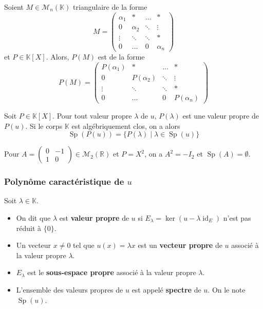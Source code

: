 	\begin{proposition}
		Soient $M \in \mathcal{M}_n(\mathbb{K})$ triangulaire de la forme
		\[
			M = \begin{pmatrix}
				\alpha_1 & * & \dots & * \\
				0 & \alpha_2 & \ddots & \vdots \\
				\vdots & \ddots & \ddots & * \\
				0 & \dots & 0 & \alpha_n
			\end{pmatrix}
		\]
		et $P \in \mathbb{K}[X]$. Alors, $P(M)$ est de la forme
		\[
		P(M) = \begin{pmatrix}
			P(\alpha_1) & * & \dots & * \\
			0 & P(\alpha_2) & \ddots & \vdots \\
			\vdots & \ddots & \ddots & * \\
			0 & \dots & 0 & P(\alpha_n)
		\end{pmatrix}
		\]
	\end{proposition}
	
	
	\begin{theorem}
		Soit $P \in \mathbb{K}[X]$. Pour tout valeur propre $\lambda$ de $u$, $P(\lambda)$ est une valeur propre de $P(u)$. Si le corps $\mathbb{K}$ est algébriquement clos, on a alors
		\[ \operatorname{Sp}(P(u)) = \{ P(\lambda) \mid \lambda \in \operatorname{Sp}(u) \} \]
	\end{theorem}
	
	\begin{cexample}
		Pour $A = \begin{pmatrix} 0 & -1 \\ 1 & 0 \end{pmatrix} \in \mathcal{M}_2(\mathbb{R})$ et $P = X^2$, on a $A^2 = -I_2$ et $\operatorname{Sp}(A) = \emptyset$.
	\end{cexample}
	
	\subsubsection{Polynôme caractéristique de \texorpdfstring{$u$}{u}}
	
	
	\begin{definition}
		Soit $\lambda \in \mathbb{K}$.
		\begin{itemize}
			\item On dit que $\lambda$ est \textbf{valeur propre} de $u$ si $E_\lambda = \ker(u - \lambda \operatorname{id}_E)$ n'est pas réduit à $\{ 0 \}$.
			\item Un vecteur $x \neq 0$ tel que $u(x) = \lambda x$ est un \textbf{vecteur propre} de $u$ associé à la valeur propre $\lambda$.
			\item $E_\lambda$ est le \textbf{sous-espace propre} associé à la valeur propre $\lambda$.
			\item L'ensemble des valeurs propres de $u$ est appelé \textbf{spectre} de $u$. On le note $\operatorname{Sp}(u)$.
		\end{itemize}
	\end{definition}
	
